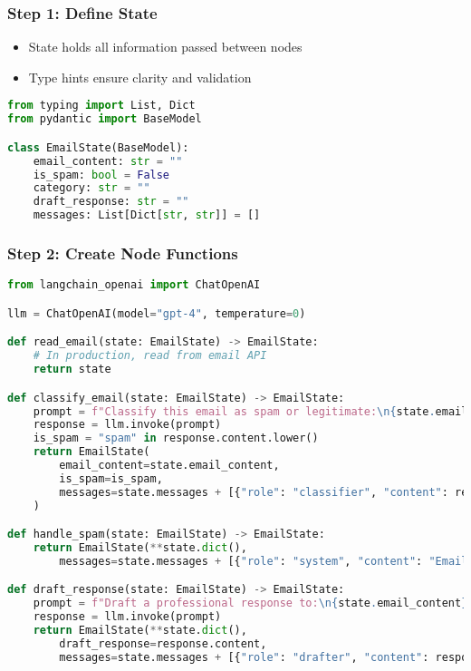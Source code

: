 \begin{frame}[fragile]\frametitle{Step 1: Define State}

      \begin{itemize}
        \item State holds all information passed between nodes
        \item Type hints ensure clarity and validation
      \end{itemize}
	  
	  
      \begin{lstlisting}[language=Python, basicstyle=\small]
from typing import List, Dict
from pydantic import BaseModel

class EmailState(BaseModel):
    email_content: str = ""
    is_spam: bool = False
    category: str = ""
    draft_response: str = ""
    messages: List[Dict[str, str]] = []
      \end{lstlisting}
      

\end{frame}

\begin{frame}[fragile]\frametitle{Step 2: Create Node Functions}
      \begin{lstlisting}[language=Python, basicstyle=\tiny]
from langchain_openai import ChatOpenAI

llm = ChatOpenAI(model="gpt-4", temperature=0)

def read_email(state: EmailState) -> EmailState:
    # In production, read from email API
    return state

def classify_email(state: EmailState) -> EmailState:
    prompt = f"Classify this email as spam or legitimate:\n{state.email_content}\nRespond with only 'spam' or 'legitimate'."
    response = llm.invoke(prompt)
    is_spam = "spam" in response.content.lower()
    return EmailState(
        email_content=state.email_content,
        is_spam=is_spam,
        messages=state.messages + [{"role": "classifier", "content": response.content}]
    )

def handle_spam(state: EmailState) -> EmailState:
    return EmailState(**state.dict(), 
        messages=state.messages + [{"role": "system", "content": "Email marked as spam"}])

def draft_response(state: EmailState) -> EmailState:
    prompt = f"Draft a professional response to:\n{state.email_content}"
    response = llm.invoke(prompt)
    return EmailState(**state.dict(), 
        draft_response=response.content,
        messages=state.messages + [{"role": "drafter", "content": response.content}])
      \end{lstlisting}
\end{frame}

